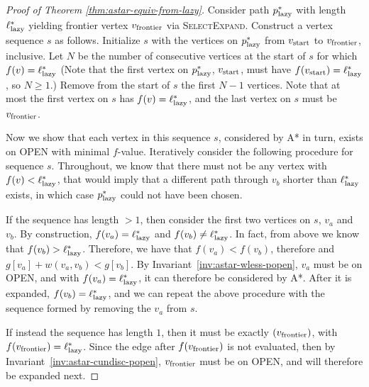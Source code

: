 \begin{proof}[Proof of Theorem \ref{thm:astar-equiv-from-lazy}]
Consider path $p^*_{\mbox{\scriptsize lazy}}$ with length $\ell^*_{\mbox{\scriptsize lazy}}$
yielding frontier vertex $v_{\mbox{\scriptsize frontier}}$ via \textsc{SelectExpand}.
Construct a vertex sequence $s$ as follows.
Initialize $s$ with the vertices on $p^*_{\mbox{\scriptsize lazy}}$
from $v_{\mbox{\scriptsize start}}$ to $v_{\mbox{\scriptsize frontier}}$, inclusive.
Let $N$ be the number of consecutive vertices at the start of $s$
for which $f(v) = \ell^*_{\mbox{\scriptsize lazy}}$
(Note that the first vertex on $p^*_{\mbox{\scriptsize lazy}}$, $v_{\mbox{\scriptsize start}}$,
must have $f(v_{\mbox{\scriptsize start}}) = \ell^*_{\mbox{\scriptsize lazy}}$,
so $N \geq 1$.)
Remove from the start of $s$ the first $N-1$ vertices.
Note that at most the first vertex on $s$ has
$f(v) = \ell^*_{\mbox{\scriptsize lazy}}$,
and the last vertex on $s$ must be $v_{\mbox{\scriptsize frontier}}$.

Now we show that each vertex in this sequence $s$,
considered by A* in turn,
exists on OPEN with minimal $f$-value.
Iteratively consider the following procedure for sequence $s$.
Throughout,
we know that there must not be any vertex with
$f(v) < \ell^*_{\mbox{\scriptsize lazy}}$,
that would imply that a different path through $v_b$ shorter than
$\ell^*_{\mbox{\scriptsize lazy}}$ exists,
in which case $p^*_{\mbox{\scriptsize lazy}}$ could not have been chosen.

If the sequence has length $>1$,
then consider the first two vertices on $s$, $v_a$ and $v_b$.
By construction,
$f(v_a) = \ell^*_{\mbox{\scriptsize lazy}}$
and 
$f(v_b) \neq \ell^*_{\mbox{\scriptsize lazy}}$.
In fact, from above
we know that $f(v_b) > \ell^*_{\mbox{\scriptsize lazy}}$.
Therefore,
we have that $f(v_a) < f(v_b)$,
therefore and $g[v_a] + w(v_a,v_b) < g[v_b]$.
By Invariant~\ref{inv:astar-wless-popen},
$v_a$ must be on OPEN,
and with $f(v_a) = \ell^*_{\mbox{\scriptsize lazy}}$,
it can therefore be considered by A*.
After it is expanded,
$f(v_b) = \ell^*_{\mbox{\scriptsize lazy}}$,
and we can repeat the above procedure
with the sequence formed by removing the $v_a$ from $s$.

If instead the sequence has length $1$,
then it must be exactly $(v_{\mbox{\scriptsize frontier}})$,
with $f(v_{\mbox{\scriptsize frontier}}) = \ell^*_{\mbox{\scriptsize lazy}}$.
Since the edge after $f(v_{\mbox{\scriptsize frontier}})$ is not
evaluated,
then by Invariant~\ref{inv:astar-cundisc-popen},
$v_{\mbox{\scriptsize frontier}}$ must be on OPEN,
and will therefore be expanded next.
\end{proof}

